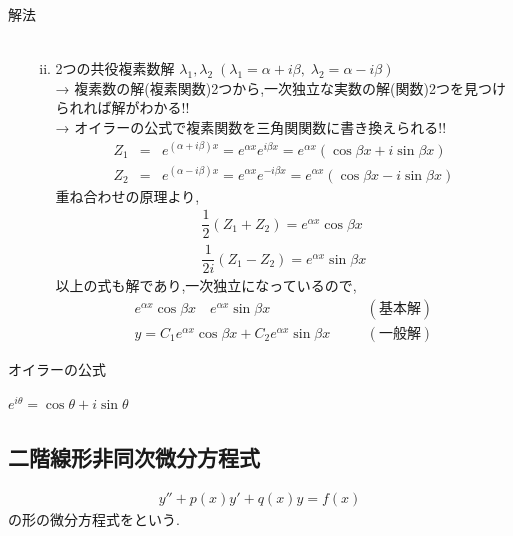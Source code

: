 \documentclass[a4paper]{jsarticle}
\begin{document}
\begin{itembox}[l]{解法}
\begin{enumerate}[(1)]
\begin{enumerate}[(i)]
\begin{eqnarray*}
                        \end{eqnarray*}
                  \item 2つの共役複素数解 $\lambda_1,\lambda_2\;\left(\lambda_1=\alpha +i\beta,\;\lambda_2=\alpha-i\beta\right)$\\
                        → 複素数の解(複素関数)2つから,一次独立な実数の解(関数)2つを見つけられれば解がわかる!!\\
                        → オイラーの公式で複素関数を三角関関数に書き換えられる!!\\
                        \begin{eqnarray*}
                            Z_1&=&e^{\left(\alpha+i\beta\right)x}=e^{\alpha x}e^{i\beta x}=e^{\alpha x}\left(\cos\beta x+i\sin\beta x\right)\\
                            Z_2&=&e^{\left(\alpha-i\beta\right)x}=e^{\alpha x}e^{-i\beta x}=e^{\alpha x}\left(\cos\beta x-i\sin\beta x\right)
                        \end{eqnarray*}
                        重ね合わせの原理より,
                        \begin{eqnarray*}
                            \dfrac{1}{2}\left(Z_1+Z_2\right)=e^{\alpha x}\cos\beta x\\
                            \dfrac{1}{2i}\left(Z_1-Z_2\right)=e^{\alpha x}\sin\beta x
                        \end{eqnarray*}
                        以上の式も解であり,一次独立になっているので,
                        \begin{eqnarray*}
                            e^{\alpha x}\cos\beta x\quad e^{\alpha x}\sin\beta x\quad &&(基本解)\\
                            y=C_1 e^{\alpha x}\cos\beta x+C_2e^{\alpha x}\sin\beta x\quad &&(一般解)
                        \end{eqnarray*}
              \end{enumerate}
    \end{enumerate}
\end{itembox}
\begin{itembox}[l]{オイラーの公式}
    \begin{center}
        $e^{i\theta}=\cos\theta+i\sin\theta$
    \end{center}
\end{itembox}
\subsection{二階線形非同次微分方程式}
\begin{eqnarray*}
    y''+p\left(x\right)y'+q\left(x\right)y=f\left(x\right)
\end{eqnarray*}
の形の微分方程式をという.
\end{document}
